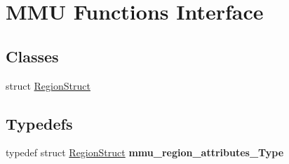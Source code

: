\hypertarget{group___m_m_u___functions}{}\section{M\+MU Functions Interface}
\label{group___m_m_u___functions}
\subsection*{Classes}
\begin{DoxyCompactItemize}
\item 
struct \hyperlink{struct_region_struct}{Region\+Struct}
\end{DoxyCompactItemize}
\subsection*{Typedefs}
\begin{DoxyCompactItemize}
\item 
typedef struct \hyperlink{struct_region_struct}{Region\+Struct} {\bfseries mmu\+\_\+region\+\_\+attributes\+\_\+\+Type}\hypertarget{group___m_m_u___functions_gad9e25908bfe54c82c1757bfbde67315e}{}\label{group___m_m_u___functions_gad9e25908bfe54c82c1757bfbde67315e}

\end{DoxyCompactItemize}
